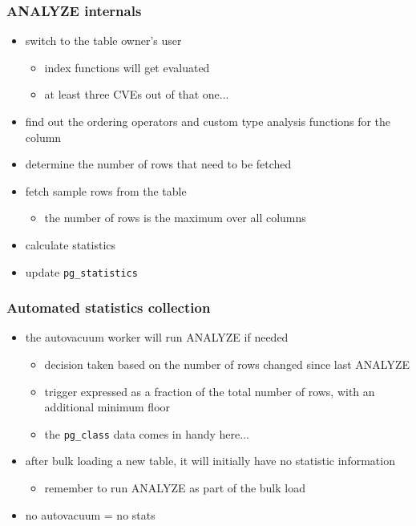 \documentclass{beamer}
\begin{document}
\begin{frame}
  \frametitle{ANALYZE internals}

  \begin{itemize}
  \item switch to the \alert{table owner's} user
    \begin{itemize}
    \item index functions will get evaluated
    \item at least \alert{three CVEs} out of that one...
    \end{itemize}
  \item find out the \alert{ordering operators} and \alert{custom type
    analysis} functions for the column
  \item determine the \alert{number of rows} that need to be fetched
  \item fetch \alert{sample rows} from the table
    \begin{itemize}
    \item the number of rows is the \alert{maximum} over all columns
    \end{itemize}
  \item \alert{calculate} statistics
  \item \alert{update} \texttt{pg\_statistics}
  \end{itemize}
\end{frame}

\begin{frame}
  \frametitle{Automated statistics collection}

  \begin{itemize}
  \item the \alert{autovacuum worker} will run ANALYZE if needed
    \begin{itemize}
    \item decision taken based on the number of \alert{rows changed} since last
      ANALYZE
    \item trigger expressed as a \alert{fraction} of the total number of rows,
      with an additional \alert{minimum} floor
    \item the \texttt{pg\_class} data comes in handy here...
    \end{itemize}
  \item after \alert{bulk loading} a new table, it will initially have no
    statistic information
    \begin{itemize}
    \item remember to \alert{run ANALYZE} as part of the bulk load
    \end{itemize}
  \item no autovacuum = \alert{no stats}
  \end{itemize}
\end{frame}
\end{document}
